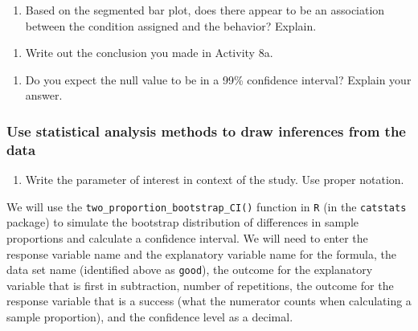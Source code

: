 \documentclass[
]{report}
\providecommand{\tightlist}{%
  \setlength{\itemsep}{0pt}\setlength{\parskip}{0pt}}
\begin{document}
\vspace{1.5in}

\begin{enumerate}
\def\labelenumi{\arabic{enumi}.}
\setcounter{enumi}{2}
\tightlist
\item
  Based on the segmented bar plot, does there appear to be an association between the condition assigned and the behavior? Explain.
\end{enumerate}

\vspace{1in}

\begin{enumerate}
\def\labelenumi{\arabic{enumi}.}
\setcounter{enumi}{3}
\tightlist
\item
  Write out the conclusion you made in Activity 8a.
\end{enumerate}

\vspace{0.8in}

\begin{enumerate}
\def\labelenumi{\arabic{enumi}.}
\setcounter{enumi}{4}
\tightlist
\item
  Do you expect the null value to be in a 99\% confidence interval? Explain your answer.
\end{enumerate}

\vspace{0.8in}

\hypertarget{use-statistical-analysis-methods-to-draw-inferences-from-the-data-2}{%
\subsubsection*{Use statistical analysis methods to draw inferences from the data}\label{use-statistical-analysis-methods-to-draw-inferences-from-the-data-2}}

\begin{enumerate}
\def\labelenumi{\arabic{enumi}.}
\setcounter{enumi}{5}
\tightlist
\item
  Write the parameter of interest in context of the study. Use proper notation.
\end{enumerate}

\vspace{1in}

We will use the \texttt{two\_proportion\_bootstrap\_CI()} function in \texttt{R} (in the \texttt{catstats} package) to simulate the bootstrap distribution of differences in sample proportions and calculate a confidence interval. We will need to enter the response variable name and the explanatory variable name for the formula, the data set name (identified above as \texttt{good}), the outcome for the explanatory variable that is first in subtraction, number of repetitions, the outcome for the response variable that is a success (what the numerator counts when calculating a sample proportion), and the confidence level as a decimal.
\end{document}
